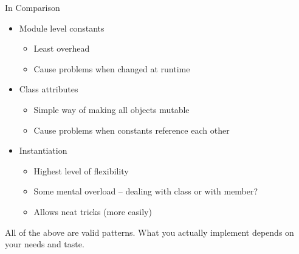 \begin{frame}{In Comparison}
%
\begin{itemize}
\item Module level constants
	\begin{itemize}
	\item Least overhead
	\item Cause problems when changed at runtime
	\end{itemize}
\item Class attributes
	\begin{itemize}
	\item Simple way of making all objects mutable
	\item Cause problems when constants reference each other
	\end{itemize}
\item Instantiation
	\begin{itemize}
	\item Highest level of flexibility
	\item Some mental overload -- dealing with class or with member?
	\item Allows neat tricks (more easily)
	\end{itemize}
\end{itemize}
%
\begin{hintbox}
\footnotesize
All of the above are valid patterns. What you actually implement depends on your needs and taste.
\end{hintbox}
%
\end{frame}


